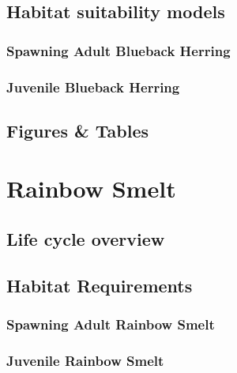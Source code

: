 \documentclass[
]{book}
\begin{document}
\hypertarget{habitat-suitability-models-6}{%
\section{Habitat suitability models}\label{habitat-suitability-models-6}}

\hypertarget{spawning-adult-blueback-herring-1}{%
\subsection{Spawning Adult Blueback Herring}\label{spawning-adult-blueback-herring-1}}

\hypertarget{juvenile-blueback-herring-1}{%
\subsection{Juvenile Blueback Herring}\label{juvenile-blueback-herring-1}}

\hypertarget{figures-tables-6}{%
\section{Figures \& Tables}\label{figures-tables-6}}

\hypertarget{rainbow-smelt}{%
\chapter{Rainbow Smelt}\label{rainbow-smelt}}

\hypertarget{life-cycle-overview-7}{%
\section{Life cycle overview}\label{life-cycle-overview-7}}

\hypertarget{habitat-requirements-7}{%
\section{Habitat Requirements}\label{habitat-requirements-7}}

\hypertarget{spawning-adult-rainbow-smelt}{%
\subsection{Spawning Adult Rainbow Smelt}\label{spawning-adult-rainbow-smelt}}

\hypertarget{juvenile-rainbow-smelt}{%
\subsection{Juvenile Rainbow Smelt}\label{juvenile-rainbow-smelt}}
\end{document}
